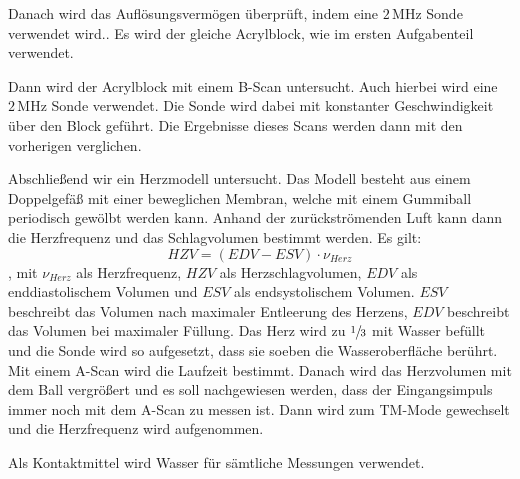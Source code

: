 Danach wird das Auflösungsvermögen überprüft, indem eine $2 \,\si{\mega\hertz}$
Sonde verwendet wird.. Es wird der gleiche Acrylblock, wie im ersten Aufgabenteil verwendet.

Dann wird der Acrylblock mit einem B-Scan untersucht. Auch hierbei wird eine $2 \,\si{\mega\hertz}$
Sonde verwendet. Die Sonde wird dabei mit konstanter Geschwindigkeit über den Block geführt.
Die Ergebnisse dieses Scans werden dann mit den vorherigen verglichen.

Abschließend wir ein Herzmodell untersucht. Das Modell besteht aus
einem Doppelgefäß mit einer beweglichen Membran, welche mit einem Gummiball periodisch gewölbt werden
kann. Anhand der zurückströmenden Luft kann dann die Herzfrequenz und das Schlagvolumen
bestimmt werden. Es gilt:
\begin{equation}
  HZV = (EDV - ESV)\cdot  \nu_{Herz}
\end{equation}
, mit $\nu_{Herz}$ als Herzfrequenz, $HZV$ als Herzschlagvolumen, $EDV$ als
enddiastolischem Volumen und $ESV$ als endsystolischem Volumen.
$ESV$ beschreibt das Volumen nach maximaler Entleerung des Herzens, $EDV$
beschreibt das Volumen bei maximaler Füllung.
Das Herz wird zu $\sfrac{1}{3}$ mit Wasser befüllt und die Sonde wird so aufgesetzt,
dass sie soeben die Wasseroberfläche berührt. Mit einem A-Scan wird die Laufzeit
bestimmt. Danach wird das Herzvolumen mit dem Ball vergrößert und es soll nachgewiesen
werden, dass der Eingangsimpuls immer noch mit dem A-Scan zu messen ist.
Dann wird zum TM-Mode gewechselt und die Herzfrequenz wird aufgenommen.

Als Kontaktmittel wird Wasser für sämtliche Messungen verwendet.
